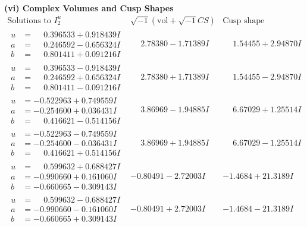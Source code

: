 \documentclass[1p]{elsarticle_modified}
\theoremstyle{definition}
\newcommand{\I}{\sqrt{-1}}
\begin{document}
\newpage\flushleft \textbf{(vi) Complex Volumes and Cusp Shapes}
$$\begin{array}{c|c|c}  
\text{Solutions to }I^u_{2}& \I (\text{vol} + \sqrt{-1}CS) & \text{Cusp shape}\\
 \hline 
\begin{aligned}
u &= \phantom{-}0.396533 + 0.918439 I \\
a &= \phantom{-}0.246592 - 0.656324 I \\
b &= \phantom{-}0.801411 + 0.091216 I\end{aligned}
 & \phantom{-}2.78380 - 1.71389 I & \phantom{-}1.54455 + 2.94870 I \\ \hline\begin{aligned}
u &= \phantom{-}0.396533 - 0.918439 I \\
a &= \phantom{-}0.246592 + 0.656324 I \\
b &= \phantom{-}0.801411 - 0.091216 I\end{aligned}
 & \phantom{-}2.78380 + 1.71389 I & \phantom{-}1.54455 - 2.94870 I \\ \hline\begin{aligned}
u &= -0.522963 + 0.749559 I \\
a &= -0.254600 + 0.036431 I \\
b &= \phantom{-}0.416621 - 0.514156 I\end{aligned}
 & \phantom{-}3.86969 - 1.94885 I & \phantom{-}6.67029 + 1.25514 I \\ \hline\begin{aligned}
u &= -0.522963 - 0.749559 I \\
a &= -0.254600 - 0.036431 I \\
b &= \phantom{-}0.416621 + 0.514156 I\end{aligned}
 & \phantom{-}3.86969 + 1.94885 I & \phantom{-}6.67029 - 1.25514 I \\ \hline\begin{aligned}
u &= \phantom{-}0.599632 + 0.688427 I \\
a &= -0.990660 + 0.161060 I \\
b &= -0.660665 - 0.309143 I\end{aligned}
 & -0.80491 - 2.72003 I & -1.4684 + 21.3189 I \\ \hline\begin{aligned}
u &= \phantom{-}0.599632 - 0.688427 I \\
a &= -0.990660 - 0.161060 I \\
b &= -0.660665 + 0.309143 I\end{aligned}
 & -0.80491 + 2.72003 I & -1.4684 - 21.3189 I \\ \hline\begin{aligned}

\end{aligned}
\end{array}$$
\end{document}
